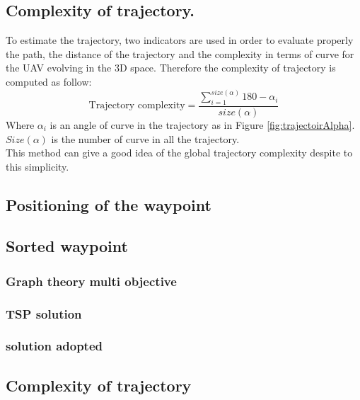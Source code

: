 \subsection{Complexity of trajectory. }\label{tarjectory}


To estimate the trajectory, two indicators are used in order to evaluate properly the path, the distance of the trajectory and the complexity in terms of curve for the UAV evolving in the 3D space.
Therefore the complexity of trajectory is computed as follow: 
\begin{equation}\label{Eq:trajectory}
\mbox{Trajectory complexity}=\frac{ \sum_{i=1}^{size(\alpha)} 180- \alpha_{i}  }{size(\alpha)}   
\end{equation}
Where $\alpha_i$ is an angle of curve in the trajectory as in Figure \ref{fig:trajectoirAlpha}. \\
$Size(\alpha)$ is the number of curve in all the trajectory.\\ 
This method  can give a good idea of the global trajectory complexity despite to this simplicity.
	
	
	
			\subsection{Positioning of the waypoint }
			
			

			\subsection{Sorted waypoint}
				\subsubsection{Graph theory multi objective  }
				\subsubsection{TSP solution }
				\subsubsection{solution adopted}
				\subsection{Complexity of trajectory }\label{tarjectory}
%

